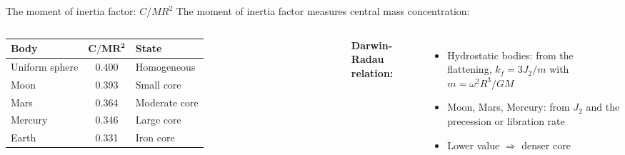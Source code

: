 \documentclass[aspectratio=169, 11pt]{beamer}
\begin{document}
\begin{frame}{The moment of inertia factor: $C/MR^2$}
  The moment of inertia factor measures central mass concentration:
  \vskip6pt
  \begin{columns}[c]
    \centering
    \footnotesize
    \begin{tabular}{l c l}
      \toprule
      \textbf{Body} & $\boldsymbol{C/MR^2}$ & \textbf{State} \\
      \midrule
      Uniform sphere & 0.400 & Homogeneous \\
      Moon           & 0.393 & Small core \\
      Mars           & 0.364 & Moderate core \\
      Mercury        & 0.346 & Large core \\
      Earth          & 0.331 & Iron core \\
      \bottomrule
    \end{tabular}
    \vskip4pt

    \textbf{Darwin-Radau relation:}
    \vskip4pt\centerline{}\vskip4pt
    \begin{itemize}
      \item Hydrostatic bodies: from the flattening, $k_f = 3J_2/m$ with $m = \omega^2R^3/GM$
      \item Moon, Mars, Mercury: from $J_2$ and the precession or libration rate
      \item Lower value $\Rightarrow$ denser core
    \end{itemize}
  \end{columns}
\end{frame}

\begin{frame}
\end{frame}

\begin{frame}
\end{frame}
\end{document}
